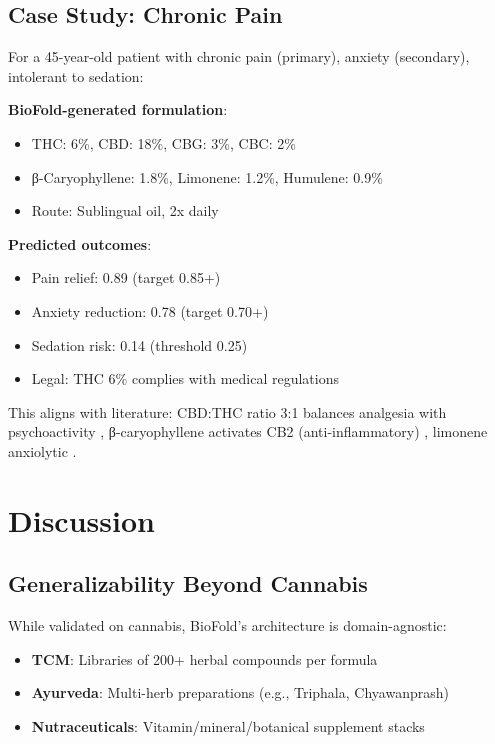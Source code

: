 \documentclass[11pt,a4paper]{article}
\begin{document}
\subsection{Case Study: Chronic Pain}

For a 45-year-old patient with chronic pain (primary), anxiety (secondary), intolerant to sedation:

\textbf{BioFold-generated formulation}:
\begin{itemize}
    \item THC: 6\%, CBD: 18\%, CBG: 3\%, CBC: 2\%
    \item β-Caryophyllene: 1.8\%, Limonene: 1.2\%, Humulene: 0.9\%
    \item Route: Sublingual oil, 2x daily
\end{itemize}

\textbf{Predicted outcomes}:
\begin{itemize}
    \item Pain relief: 0.89 (target 0.85+)
    \item Anxiety reduction: 0.78 (target 0.70+)
    \item Sedation risk: 0.14 (threshold 0.25)
    \item Legal: THC 6\% complies with medical regulations
\end{itemize}

This aligns with literature: CBD:THC ratio 3:1 balances analgesia with psychoactivity \cite{Russo2011}, β-caryophyllene activates CB2 (anti-inflammatory) \cite{Gertsch2008}, limonene anxiolytic \cite{Komiya2006}.

\section{Discussion}

\subsection{Generalizability Beyond Cannabis}

While validated on cannabis, BioFold's architecture is domain-agnostic:
\begin{itemize}
    \item \textbf{TCM}: Libraries of 200+ herbal compounds per formula
    \item \textbf{Ayurveda}: Multi-herb preparations (e.g., Triphala, Chyawanprash)
    \item \textbf{Nutraceuticals}: Vitamin/mineral/botanical supplement stacks
\end{itemize}
\end{document}

